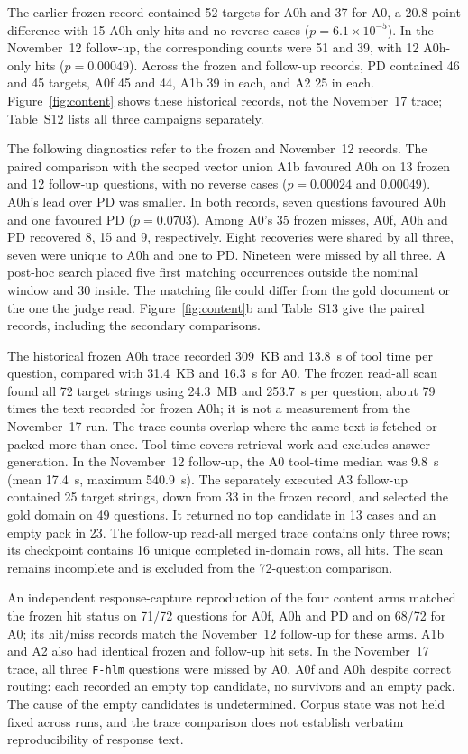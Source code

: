 The earlier frozen record contained 52 targets for A0h and 37 for A0,
a 20.8-point difference with 15 A0h-only hits and no reverse cases
($p=6.1\times10^{-5}$). In the November~12 follow-up, the corresponding
counts were 51 and 39, with 12 A0h-only hits ($p=0.00049$). Across the
frozen and follow-up records, PD contained 46 and 45 targets, A0f 45
and 44, A1b 39 in each, and A2 25 in each. Figure~\ref{fig:content} shows
these historical records, not the November~17 trace; Table~S12 lists all
three campaigns separately.

The following diagnostics refer to the frozen and November~12 records.
The paired comparison with the scoped vector union A1b favoured A0h on
13 frozen and 12 follow-up questions, with no reverse cases
($p=0.00024$ and $0.00049$). A0h's lead over PD was smaller. In both
records, seven questions favoured A0h and one favoured PD
($p=0.0703$). Among A0's 35 frozen misses, A0f, A0h and PD recovered
8, 15 and 9, respectively. Eight recoveries were shared by all three,
seven were unique to A0h and one to PD. Nineteen were missed by all three.
A post-hoc search placed five first matching occurrences outside the
nominal window and 30 inside. The matching file could differ from the gold
document or the one the judge read. Figure~\ref{fig:content}b and Table~S13
give the paired records, including the secondary comparisons.

The historical frozen A0h trace recorded 309~KB and 13.8~s of tool time per question, compared with
31.4~KB and 16.3~s for A0. The frozen read-all scan found all 72 target strings
using 24.3~MB and 253.7~s per question, about 79 times the text recorded
for frozen A0h; it is not a measurement from the November~17 run. The trace
counts overlap where the same text is fetched or packed more than once. Tool
time covers retrieval work and excludes answer generation. In the November~12
follow-up, the A0 tool-time median was 9.8~s (mean 17.4~s, maximum 540.9~s).
The separately executed A3 follow-up contained 25 target strings, down from
33 in the frozen record, and selected the gold domain on 49 questions. It
returned no top candidate in 13 cases and an empty pack in 23. The follow-up
read-all merged trace contains only three rows; its checkpoint contains 16
unique completed in-domain rows, all hits. The scan remains incomplete and
is excluded from the 72-question comparison.

An independent response-capture reproduction of the four content arms
matched the frozen hit status on 71/72 questions for A0f, A0h and PD and
on 68/72 for A0; its hit/miss records match the November~12 follow-up for
these arms. A1b and A2 also had identical frozen and follow-up hit sets.
In the November~17 trace, all three \texttt{F-hlm} questions were missed
by A0, A0f and A0h despite correct routing: each recorded an empty top
candidate, no survivors and an empty pack. The cause of the empty candidates
is undetermined. Corpus state was not held fixed across runs, and the trace
comparison does not establish verbatim reproducibility of response text.

